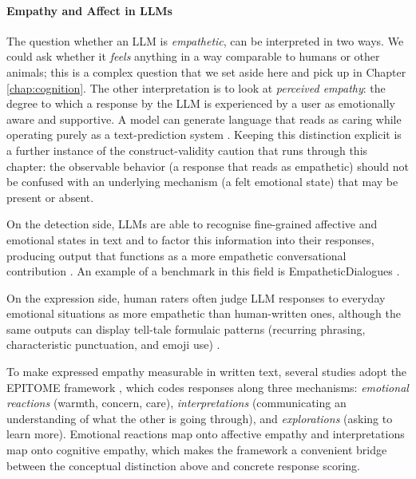 \paragraph{Empathy and Affect in LLMs} 
The question whether an LLM is {\em empathetic}, can be interpreted in two ways. We could ask whether it {\em feels} anything in a way comparable to humans or other animals; this is a complex question that we set aside here and pick up in Chapter \ref{chap:cognition}. The other interpretation is to look at \emph{perceived empathy}: the degree to which a response by the LLM is experienced by a user as emotionally aware and supportive. A model can generate language that reads as caring while operating purely as a text-prediction system \citep{sorin2024large}. Keeping this distinction explicit is a further instance of the construct-validity caution that runs through this chapter: the observable behavior (a response that reads as empathetic) should not be confused with an underlying mechanism (a felt emotional state) that may be present or absent.

On the detection side, LLMs are able to recognise fine-grained affective and emotional states in text \citep{broekens2023fine} and to factor this information into their responses, producing output that functions as a more empathetic conversational contribution \citep{yang2024enhancing, yan2024talkhumanlikeagentsempathetic}. 
An example of a benchmark in this field is EmpatheticDialogues \citep{rashkin2019towards}.

On the expression side, human raters often judge LLM responses to everyday emotional situations as more empathetic than human-written ones, although the same outputs can display tell-tale formulaic patterns (recurring phrasing, characteristic punctuation, and emoji use) \citep{lee2024large}. 

To make expressed empathy measurable in written text, several studies adopt the EPITOME framework \citep{sharma2020computational}, which codes responses along three mechanisms: \emph{emotional reactions} (warmth, concern, care), \emph{interpretations} (communicating an understanding of what the other is going through), and \emph{explorations} (asking to learn more). Emotional reactions map onto affective empathy and interpretations map onto cognitive empathy, which makes the framework a convenient bridge between the conceptual distinction above and concrete response scoring.

